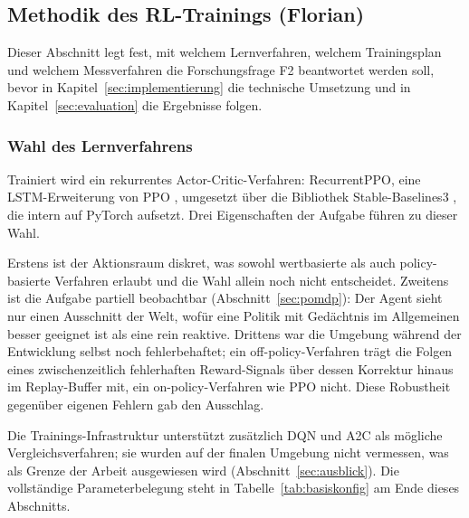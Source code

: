 \documentclass[11pt,a4paper]{article}
\begin{document}
\subsection{Methodik des RL-Trainings (Florian)}
\label{sec:methodik}

Dieser Abschnitt legt fest, mit welchem Lernverfahren, welchem Trainingsplan
und welchem Messverfahren die Forschungsfrage F2 beantwortet werden soll,
bevor in Kapitel~\ref{sec:implementierung} die technische Umsetzung und in
Kapitel~\ref{sec:evaluation} die Ergebnisse folgen.

\subsubsection{Wahl des Lernverfahrens}

Trainiert wird ein rekurrentes Actor-Critic-Verfahren: RecurrentPPO, eine
LSTM-Erweiterung von PPO \cite{schulman2017ppo, hochreiter1997lstm},
umgesetzt über die Bibliothek Stable-Baselines3 \cite{raffin2021stable}, die
intern auf PyTorch \cite{paszke2019pytorch} aufsetzt.
Drei Eigenschaften der Aufgabe führen zu dieser Wahl.

Erstens ist der Aktionsraum diskret, was sowohl wertbasierte als auch
policy-basierte Verfahren erlaubt und die Wahl allein noch nicht entscheidet.
Zweitens ist die Aufgabe partiell beobachtbar (Abschnitt~\ref{sec:pomdp}):
Der Agent sieht nur einen Ausschnitt der Welt, wofür eine Politik mit
Gedächtnis im Allgemeinen besser geeignet ist als eine rein reaktive.
Drittens war die Umgebung während der Entwicklung selbst noch fehlerbehaftet;
ein off-policy-Verfahren trägt die Folgen eines zwischenzeitlich fehlerhaften
Reward-Signals über dessen Korrektur hinaus im Replay-Buffer mit, ein
on-policy-Verfahren wie PPO nicht. Diese Robustheit gegenüber eigenen
Fehlern gab den Ausschlag.

Die Trainings-Infrastruktur unterstützt zusätzlich DQN und A2C als mögliche
Vergleichsverfahren; sie wurden auf der finalen Umgebung nicht vermessen, was
als Grenze der Arbeit ausgewiesen wird (Abschnitt~\ref{sec:ausblick}). Die
vollständige Parameterbelegung steht in Tabelle~\ref{tab:basiskonfig} am Ende
dieses Abschnitts.
\end{document}
